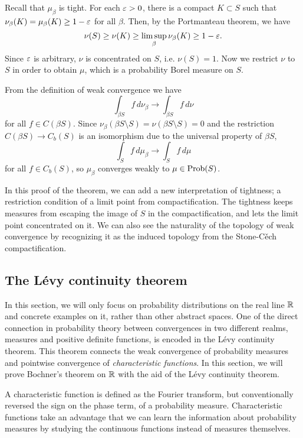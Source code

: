 \documentclass[10pt]{article}
\begin{document}
\begin{pf}
Recall that $\mu_\beta$ is tight.
For each $\varepsilon>0$, there is a compact $K\subset S$ such that $\nu_\beta(K)=\mu_\beta(K)\ge1-\varepsilon$ for all $\beta$.
Then, by the Portmanteau theorem, we have
\[\nu(S)\ge\nu(K)\ge\limsup_\beta\nu_\beta(K)\ge1-\varepsilon.\]
Since $\varepsilon$ is arbitrary, $\nu$ is concentrated on $S$, i.e. $\nu(S)=1$.
Now we restrict $\nu$ to $S$ in order to obtain $\mu$, which is a probability Borel measure on $S$.

From the definition of weak convergence we have
\[\int_{\beta S}f\,d\nu_\beta\to\int_{\beta S}f\,d\nu\]
for all $f\in C(\beta S)$.
Since $\nu_\beta(\beta S\setminus S)=\nu(\beta S\setminus S)=0$ and the restriction $C(\beta S)\to C_b(S)$ is an isomorphism due to the universal property of $\beta S$,
\[\int_Sf\,d\mu_\beta\to\int_Sf\,d\mu\]
for all $f\in C_b(S)$, so $\mu_\beta$ converges weakly to $\mu\in\operatorname{Prob}(S)$.
\end{pf}

In this proof of the theorem, we can add a new interpretation of tightness; a restriction condition of a limit point from compactification.
The tightness keeps measures from escaping the image of $S$ in the compactification, and lets the limit point concentrated on it.
We can also see the naturality of the topology of weak convergence by recognizing it as the induced topology from the Stone-C\v ech compactification.



\subsection{The L\'evy continuity theorem}

In this section, we will only focus on probability distributions on the real line $\mathbb{R}$ and concrete examples on it, rather than other abstract spaces.
One of the direct connection in probability theory between convergences in two different realms, measures and positive definite functions, is encoded in the L\'evy continuity theorem.
This theorem connects the weak convergence of probability measures and pointwise convergence of \emph{characteristic functions}.
In this section, we will prove Bochner's theorem on $\mathbb{R}$ with the aid of the L\'evy continuity theorem.

A characteristic function is defined as the Fourier transform, but conventionally reversed the sign on the phase term, of a probability measure.
Characteristic functions take an advantage that we can learn the information about probability measures by studying the continuous functions instead of measures themselves.
\end{document}
